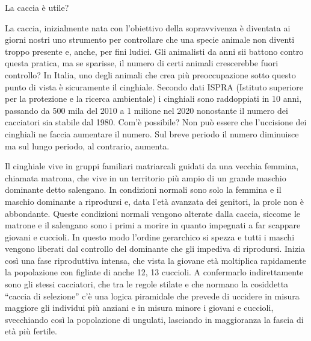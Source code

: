 \documentclass[12pt]{book} %
\begin{document}
\bigskip
\begin{mdframed}[linewidth=1pt]
La caccia è utile?

La caccia, inizialmente nata con l'obiettivo della sopravvivenza è diventata ai giorni nostri uno
strumento per controllare che una specie animale non diventi troppo presente e, anche, per fini ludici. Gli animalisti
da anni sii battono contro questa pratica, ma se sparisse, il numero di certi animali crescerebbe fuori controllo? In
Italia, uno degli animali che crea più preoccupazione sotto questo punto di vista è sicuramente il cinghiale. Secondo
dati ISPRA (Istituto superiore per la protezione e la ricerca ambientale) i cinghiali sono raddoppiati in 10 anni,
passando da 500 mila del 2010 a 1 milione nel 2020 nonostante il numero dei cacciatori sia stabile dal
1980. Com'è possibile? Non può essere che l'uccisione dei cinghiali ne faccia
aumentare il numero. Sul breve periodo il numero diminuisce ma sul lungo periodo, al contrario, aumenta.

Il cinghiale vive in gruppi familiari matriarcali guidati da una vecchia femmina, chiamata matrona, che vive in un
territorio più ampio di un grande maschio dominante detto salengano. In condizioni normali sono solo la femmina e il
maschio dominante a riprodursi e, data l'età avanzata dei genitori, la prole non è abbondante.
Queste condizioni normali vengono alterate dalla caccia, siccome le matrone e il salengano sono i primi a morire in
quanto impegnati a far scappare giovani e cuccioli. In questo modo l'ordine gerarchico si spezza e
tutti i maschi vengono liberati dal controllo del dominante che gli impediva di riprodursi. Inizia così una fase
riproduttiva intensa, che vista la giovane età moltiplica rapidamente la popolazione con figliate di anche 12, 13
cuccioli. A confermarlo indirettamente sono gli stessi cacciatori, che tra le regole stilate e che normano la
cosiddetta “caccia di selezione” c'è una logica piramidale che prevede di uccidere in misura maggiore gli individui più
anziani e in misura minore i giovani e cuccioli, svecchiando così la popolazione di ungulati, lasciando in maggioranza
la fascia di età più fertile.


\end{mdframed}
\end{document}
